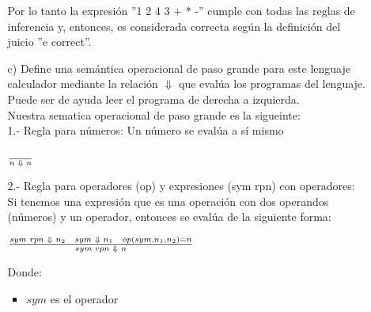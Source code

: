 \documentclass{article}
\begin{document}
\begin{enumerate}
\begin{itemize}
            Por lo tanto la expresión ''1 2 4 3 + * -'' cumple con todas las reglas de inferencia y, entonces, es considerada correcta según la definición del juicio ''e correct''.\\
            
            \item[c)] Define una semántica operacional de paso grande para este lenguaje calculador mediante la relación $\Downarrow$ que evalúa los programas del lenguaje. Puede ser de ayuda leer el programa de derecha a izquierda.\\

            Nuestra sematica operacional de paso grande es la sigueinte:\\

            1.- Regla para números: Un número se evalúa a sí mismo
            \begin{center}
                \Large{$\frac{}{n\hspace{0.1cm}\Downarrow\hspace{0.1cm}n}$}
            \end{center}
            
            2.- Regla para operadores (op) y expresiones (sym rpn) con operadores:\\
            
            Si tenemos una expresión que es una operación con dos operandos (números) y un operador, entonces se evalúa de la siguiente forma:

            \begin{center}
                \Large{$\frac{sym\hspace{0.1cm}rpn\hspace{0.1cm}\Downarrow\hspace{0.1cm}n_2\hspace{0.3cm}sym\hspace{0.1cm}\Downarrow\hspace{0.1cm}n_1\hspace{0.3cm}op(sym,n_1,n_2) = n}{sym\hspace{0.1cm}rpn\hspace{0.1cm}\Downarrow\hspace{0.1cm}n}$}
            \end{center}

            Donde:\\
            \begin{itemize}
                \item $sym$ es el operador


\end{itemize}
\end{itemize}
\end{enumerate}
\end{document}
